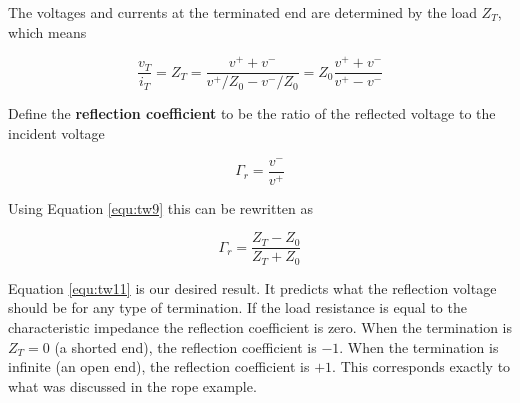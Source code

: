 \noindent The voltages and currents at the terminated end are determined by the load $Z_T$, which means

\begin{equation}
\dfrac{v_T}{i_T}=Z_T=\dfrac{v^++v^-}{v^+/Z_0-v^-/Z_0}=Z_0\dfrac{v^++v^-}{v^+-v^-}
\label{equ:tw9}
\end{equation}

\noindent Define the {\bf reflection coefficient} to be the ratio of the reflected voltage to the incident voltage

\begin{equation}
\Gamma_r=\dfrac{v^-}{v^+}
\label{equ:tw10}
\end{equation}

\noindent Using Equation \ref{equ:tw9} this can be rewritten as

\begin{equation}
\Gamma_r=\dfrac{Z_T-Z_0}{Z_T+Z_0}
\label{equ:tw11}
\end{equation}

Equation \ref{equ:tw11} is our desired result. It predicts what the reflection voltage should be for any type of termination. If the load resistance is equal to the characteristic impedance the reflection coefficient is zero.  When the termination is $Z_T = 0$ (a shorted end), the reflection coefficient is $-1$. When the termination is infinite (an open end), the reflection coefficient is $+1$. This corresponds exactly to what was discussed in the rope example.

